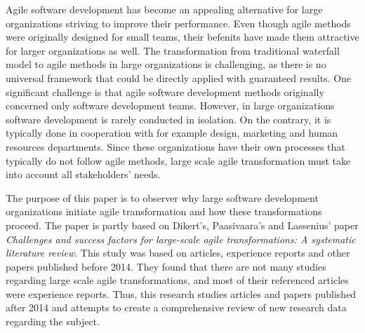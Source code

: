 Agile software development has become an appealing alternative for
large organizations striving to improve their performance. Even
though agile methods were originally designed for small teams, their
befenits have made them attractive for larger organizations as well.
The transformation from traditional waterfall model to agile methods
in large organizations is challenging, as there is no universal
framework that could be directly applied with guaranteed results.
One significant challenge is that agile software development methods
originally concerned only software development teams. However, in
large organizations software development is rarely conducted in
isolation. On the contrary, it is typically done in cooperation with for
example design, marketing and human resources departments. Since these
organizations have their own processes that typically do not follow
agile methods, large scale agile transformation must take into account
all stakeholders' needs.

The purpose of this paper is to observer why large software
development organizations initiate agile transformation and how these
transformations proceed. The paper is partly based on Dikert's,
Paasivaara's and Lassenius' paper \textit{Challenges and success
factors for large-scale agile transformations: A systematic literature
review}. This study was based on articles, experience reports and
other papers published before 2014. They found that there are not many
studies regarding large scale agile transformations, and most of their
referenced articles were experience reports. Thus, this research studies
articles and papers published after 2014 and attempts to create a
comprehensive review of new research data regarding the subject.
